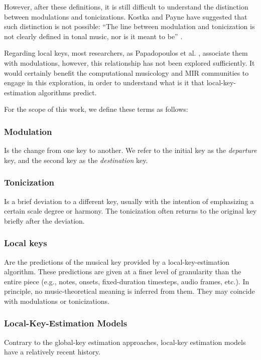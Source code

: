 However, after these definitions, it is still difficult to understand the distinction between modulations and tonicizations. Kostka and Payne have suggested that such distinction is not possible: ``The line between modulation and tonicization is not clearly defined in tonal music, nor is it meant to be'' \cite{kostka2008tonal}.

Regarding local keys, most researchers, as Papadopoulos et al. \cite{papadopoulos_local_2009}, associate them with modulations, however, this relationship has not been explored sufficiently. It would certainly benefit the computational musicology and MIR communities to engage in this exploration, in order to understand what is it that local-key-estimation algorithms predict.

For the scope of this work, we define these terms as follows:

\subsubsection{Modulation}
Is the change from one key to another. We refer to the initial key as the \emph{departure} key, and the second key as the \emph{destination} key.

\subsubsection{Tonicization}
Is a brief deviation to a different key, usually with the intention of emphasizing a certain scale degree or harmony.
The tonicization often returns to the original key briefly after the deviation.

\subsubsection{Local keys}
Are the predictions of the musical key provided by a local-key-estimation algorithm.
These predictions are given at a finer level of granularity than the entire piece (e.g., notes, onsets, fixed-duration timesteps, audio frames, etc.).
In principle, no music-theoretical meaning is inferred from them. They may coincide with modulations or tonicizations.

\subsubsection{Local-Key-Estimation Models}\label{ssec:localkey}

Contrary to the global-key estimation approaches, local-key estimation models have a relatively recent history.


